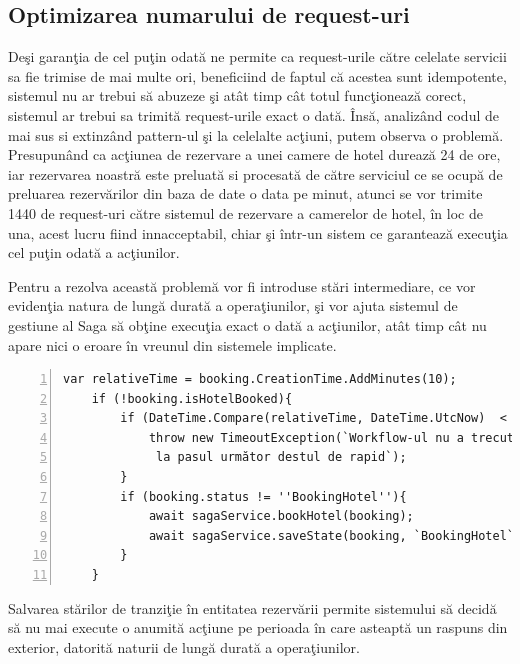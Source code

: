 \documentclass[a4paper,12pt]{report}
\begin{document}
\subsection{Optimizarea numarului de request-uri}
 \par Deşi garanţia de cel puţin odată ne permite ca request-urile către celelate servicii sa fie trimise de mai multe ori, beneficiind de faptul că acestea sunt idempotente, sistemul nu ar trebui să abuzeze şi atât timp cât totul funcţionează corect, sistemul ar trebui sa trimită request-urile exact o dată. Însă, analizând codul de mai sus si extinzând pattern-ul şi la celelalte acţiuni, putem observa o problemă. Presupunând ca acţiunea de rezervare a unei camere de hotel durează 24 de ore, iar rezervarea noastră este preluată si procesată de către serviciul ce se ocupă de preluarea rezervărilor din baza de date o data pe minut, atunci se vor trimite 1440 de request-uri către sistemul de rezervare a camerelor de hotel, în loc de una, acest lucru fiind innacceptabil, chiar şi într-un sistem ce garantează execuţia cel puţin odată a acţiunilor. 
 \par Pentru a rezolva această problemă vor fi introduse stări intermediare, ce vor evidenţia natura de lungă durată a operaţiunilor, şi vor ajuta sistemul de gestiune al Saga să obţine execuţia exact o dată a acţiunilor, atât timp cât nu apare nici o eroare în vreunul din sistemele implicate. 
 \begin{Verbatim}[numbers=left]
	var relativeTime = booking.CreationTime.AddMinutes(10);
	if (!booking.isHotelBooked){
		if (DateTime.Compare(relativeTime, DateTime.UtcNow)  < 0 ){
			throw new TimeoutException(`Workflow-ul nu a trecut
			 la pasul următor destul de rapid`);
		}
		if (booking.status != ''BookingHotel''){
			await sagaService.bookHotel(booking);
			await sagaService.saveState(booking, `BookingHotel`);
		}
	}
\end{Verbatim}
\par Salvarea stărilor de tranziţie în entitatea rezervării permite sistemului să decidă să nu mai execute o anumită acţiune pe perioada în care asteaptă un raspuns din exterior, datorită naturii de lungă durată a operaţiunilor.
\end{document}
